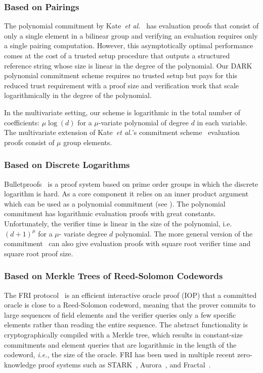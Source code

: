 \subsubsection{Based on Pairings}

The polynomial commitment by Kate~\emph{et al.}~\cite{AC:KatZavGol10} has evaluation proofs that consist of only a single element in a bilinear group and verifying an evaluation requires only a single pairing computation. However, this asymptotically optimal performance comes at the cost of a trusted setup procedure that outputs a structured reference string whose size is linear in the degree of the polynomial. Our DARK polynomial commitment scheme requires no trusted setup but pays for this reduced trust requirement with a proof size and verification work that scale logarithmically in the degree of the polynomial.

In the multivariate setting, our scheme is logarithmic in the total number of coefficients: $\mu\log(d)$ for a $\mu$-variate polynomial of degree $d$ in each variable. The multivariate extension of Kate~\emph{et al.}'s commitment scheme~\cite{SP:ZGKPP17} evaluation proofs consist of $\mu$ group elements.

\subsubsection{Based on Discrete Logarithms}

\textsf{Bulletproofs}~\cite{EC:BCCGP16,SP:BBBPWM18} is a proof system based on prime order groups in which the discrete logarithm is hard. As a core component it relies on an inner product argument which can be used as a polynomial commitment (see \cite{SP:WTSTW18}). The polynomial commitment has logarithmic evaluation proofs with great constants. Unfortunately, the verifier time is linear in the size of the polynomial, i.e. $(d+1)^\mu$ for a $\mu$- variate degree $d$ polynomial.
The more general version of the commitment~\cite{EC:BCCGP16} can also give evaluation proofs with square root verifier time and square root proof size.


\subsubsection{Based on Merkle Trees of Reed-Solomon Codewords} \label{subsection:fri}

The FRI protocol~\cite{ICALP:BBHR18} is an efficient interactive oracle proof (IOP) that a committed oracle is close to a Reed-Solomon codeword, meaning that the prover commits to large sequences of field elements and the verifier queries only a few specific elements rather than reading the entire sequence. The abstract functionality is cryptographically compiled with a Merkle tree, which results in constant-size commitments and element queries that are logarithmic in the length of the codeword, \emph{i.e.}, the size of the oracle. FRI has been used in multiple recent zero-knowledge proof systems such as  \textsf{STARK}~\cite{C:BBHR19}, \textsf{Aurora}~\cite{EC:BCRSVW19}, and \textsf{Fractal}~\cite{Fractal}.

